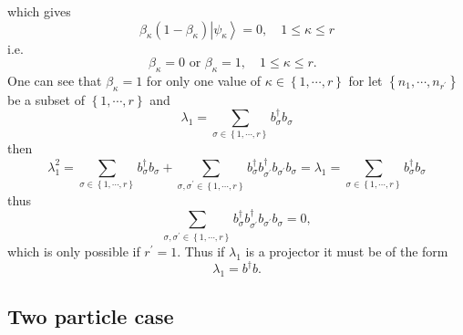 \documentclass[aps,preprint]{revtex4}%
\begin{document}
which gives
\begin{equation}
\beta_{\kappa}\left(  1-\beta_{\kappa}\right)  \left\vert \psi_{\kappa
}\right\rangle =0,\quad1\leq\kappa\leq r
\end{equation}
i.e.
\begin{equation}
\beta_{\kappa}=0\text{ or }\beta_{\kappa}=1,\quad1\leq\kappa\leq r.\text{ }%
\end{equation}
One can see that $\beta_{\kappa}=1$ for only one value of $\kappa\in\left\{
1,\cdots,r\right\}  $ for let $\left\{  n_{1},\cdots,n_{r^{\prime}}\right\}  $
be a subset of $\left\{  1,\cdots,r\right\}  $ and
\begin{equation}
\lambda_{1}=\sum_{\sigma\in\left\{  1,\cdots,r\right\}  }b_{\sigma}^{\dagger
}b_{\sigma}%
\end{equation}
then
\begin{equation}
\lambda_{1}^{2}=\sum_{\sigma\in\left\{  1,\cdots,r\right\}  }b_{\sigma
}^{\dagger}b_{\sigma}+\sum_{\sigma,\sigma^{\prime}\in\left\{  1,\cdots
,r\right\}  }b_{\sigma}^{\dagger}b_{\sigma^{\prime}}^{\dagger}b_{\sigma
^{\prime}}b_{\sigma}=\lambda_{1}=\sum_{\sigma\in\left\{  1,\cdots,r\right\}
}b_{\sigma}^{\dagger}b_{\sigma}%
\end{equation}
thus
\begin{equation}
\sum_{\sigma,\sigma^{\prime}\in\left\{  1,\cdots,r\right\}  }b_{\sigma
}^{\dagger}b_{\sigma^{\prime}}^{\dagger}b_{\sigma^{\prime}}b_{\sigma}=0,
\end{equation}
which is only possible if $r^{\prime}=1.$ Thus if $\lambda_{1}$ is a projector
it must be of the form
\begin{equation}
\lambda_{1}=b^{\dagger}b.
\end{equation}


\subsection{Two particle case}
\end{document}
